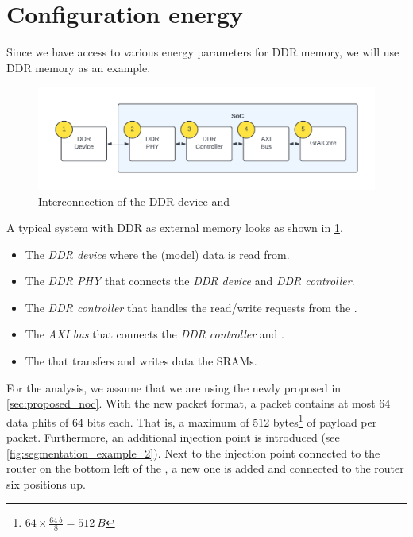 \section{Configuration energy}
Since we have access to various energy parameters for DDR memory, we will use DDR memory as an example.

\begin{figure}[hbtp]
    \centering
    \includegraphics[width=0.8\linewidth]{assets/ddr_graicore_block_diagram.pdf}
    \caption{
        Interconnection of the DDR device and \graicore{}
    }
    \label{fig:ddr_graicore_block_diagram}
\end{figure}

A typical system with DDR as external memory looks as shown in \cref{fig:ddr_graicore_block_diagram}.
\begin{itemize}
    \item The \textit{DDR device} where the (model) data is read from.
    \item The \textit{DDR PHY} that connects the \textit{DDR device} and \textit{DDR controller}.
    \item The \textit{DDR controller} that handles the read/write requests from the \textit{\graicore{}}.
    \item The \textit{AXI bus} that connects the \textit{DDR controller} and \textit{\graicore{}}.
    \item The \textit{\graicore{}} that transfers and writes data the SRAMs.
\end{itemize}

For the analysis, we assume that we are using the newly proposed \confignoc{} in \cref{sec:proposed_noc}. 
With the new packet format, a packet contains at most 64 data phits of 64 bits each.
That is, a maximum of 512 bytes\footnote{$64 \times \frac{\SI{64}{b}}{8} = \SI{512}{B}$} of payload per packet.
Furthermore, an additional injection point is introduced (see \cref{fig:segmentation_example_2}).
Next to the injection point connected to the router on the bottom left of the \confignoc{}, a new one is added and connected to the router six positions up.

